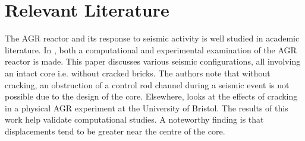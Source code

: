 \section{Relevant Literature}

The AGR reactor and its response to seismic activity is well studied in academic literature. In \cite{voyagaki2018earthquake}, both a computational and experimental examination of the AGR reactor is made. This paper discusses various seismic configurations, all involving an intact core i.e. without cracked bricks. The authors note that without cracking, an obstruction of a control rod channel during a seismic event is not possible due to the design of the core. Elsewhere, \cite{oddbjornsson2017physical} looks at the effects of cracking in a physical AGR experiment at the University of Bristol. The results of this work help validate computational studies. A noteworthy finding is that displacements tend to be greater near the centre of the core.